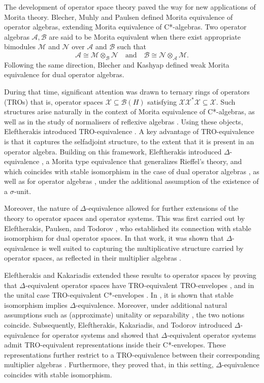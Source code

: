 \documentclass[11pt]{amsart}
\numberwithin{equation}{section}
\theoremstyle{plain}
\theoremstyle{definition}
\theoremstyle{remark}
\newcommand{\A}{{\mathcal{A}}}
\newcommand{\B}{{\mathcal{B}}}
\newcommand{\M}{{\mathcal{M}}}
\newcommand{\N}{{\mathcal{N}}}
\newcommand{\X}{{\mathcal{X}}}
\newcommand{\qand}{\quad\text{and}\quad}
\begin{document}
The development of operator space theory paved the way for new applications of Morita theory. Blecher, Muhly and Paulsen \cite{BMP00} defined Morita equivalence of operator algebras, extending Morita equivalence of C*-algebras. Two operator algebras $\A,\B$ are said to be Morita equivalent when there exist appropriate bimodules $\M$ and $\N$ over $\A$ and $\B$ such that
\[
\A\cong \M\otimes_\B \N \qand \B\cong \N\otimes_\A \M.
\]
Following the same direction, Blecher and Kashyap \cite{BK08} defined weak Morita equivalence for dual operator algebras.

During that time, significant attention was drawn to ternary rings of operators (TROs) that is, operator spaces $\X \subseteq \B(H)$ satisfying $\X \X^* \X \subseteq \X$. Such structures arise naturally in the context of Morita equivalence of C*-algebras, as well as in the study of normalisers of reflexive algebras \cite{KT03}.
Using these objects, Eleftherakis introduced TRO-equivalence \cite{Ele12}. A key advantage of TRO-equivalence is that it captures the selfadjoint structure, to the extent that it is present in an operator algebra. Building on this framework, Eleftherakis introduced $\Delta$-equivalence \cite{Ele08}, a Morita type equivalence that generalizes Rieffel’s theory, and which coincides with stable isomorphism in the case of dual operator algebras \cite{EP08}, as well as for operator algebras \cite{Ele16}, under the additional assumption of the existence of a $\sigma$-unit.

Moreover, the nature of $\Delta$-equivalence allowed for further extensions of the theory to operator spaces and operator systems. This was first carried out by Eleftherakis, Paulsen, and Todorov \cite{EPT10}, who established its connection with stable isomorphism for dual operator spaces. In that work, it was shown that $\Delta$-equivalence is well suited to capturing the multiplicative structure carried by operator spaces, as reflected in their multiplier algebras \cite[Theorem 2.13]{EPT10}.

Eleftherakis and Kakariadis \cite{EK17} extended these results to operator spaces by proving that $\Delta$-equivalent operator spaces have TRO-equivalent TRO-envelopes \cite[Theorem 5.10]{EK17}, and in the unital case TRO-equivalent C*-envelopes \cite[Theorem 4.11]{EK17}. In \cite[Theorem 4.3]{EK17}, it is shown that stable isomorphism implies $\Delta$-equivalence. Moreover, under additional natural assumptions such as (approximate) unitality \cite[Corollary 4.7]{EK17} or separability \cite[Corollary 4.8]{EK17}, the two notions coincide.
Subsequently, Eleftherakis, Kakariadis, and Todorov \cite{EKT21} introduced $\Delta$-equivalence for operator systems and showed that $\Delta$-equivalent operator systems admit TRO-equivalent representations inside their C*-envelopes. These representations further restrict to a TRO-equivalence between their corresponding multiplier algebras \cite[Proposition 3.9]{EKT21}. Furthermore, they proved that, in this setting, $\Delta$-equivalence coincides with stable isomorphism.
\end{document}
